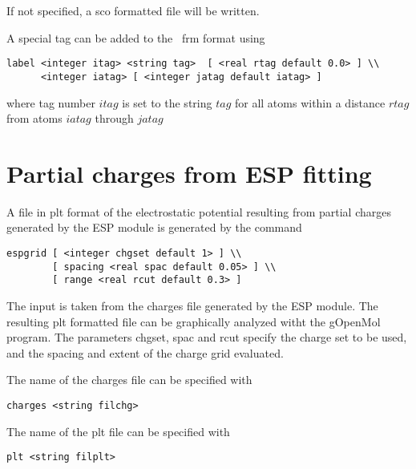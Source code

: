 If not specified, a {\rm sco} formatted file will be written.

A special tag can be added to the \ecce\ frm format using

\begin{verbatim}
label <integer itag> <string tag>  [ <real rtag default 0.0> ] \\
      <integer iatag> [ <integer jatag default iatag> ]
\end{verbatim}

where tag number $itag$ is set to the string $tag$ for all atoms
within a distance $rtag$ from atoms $iatag$ through $jatag$

\section{Partial charges from ESP fitting}

A file in plt format of the electrostatic potential resulting
from partial charges generated by the ESP module is generated
by the command

\begin{verbatim}
espgrid [ <integer chgset default 1> ] \\
        [ spacing <real spac default 0.05> ] \\
        [ range <real rcut default 0.3> ]
\end{verbatim}

The input is taken from the charges file generated by the ESP module. The
resulting plt formatted file can be graphically analyzed witht the
gOpenMol program. The parameters chgset, spac and rcut specify the
charge set to be used, and the spacing and extent of the charge grid
evaluated.

The name of the charges file can be specified with

\begin{verbatim}
charges <string filchg>
\end{verbatim}

The name of the plt file can be specified with

\begin{verbatim}
plt <string filplt>
\end{verbatim}

